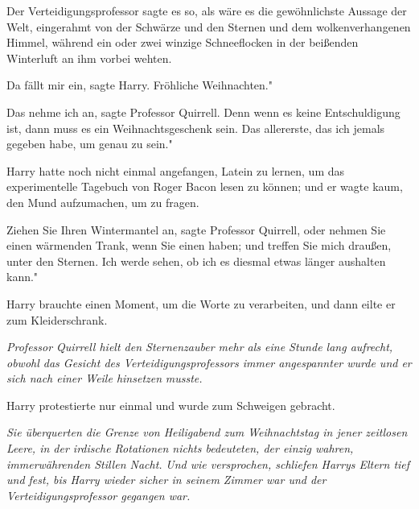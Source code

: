 Der Verteidigungsprofessor sagte es so, als wäre es die gewöhnlichste Aussage
der Welt, eingerahmt von der Schwärze und den Sternen und dem wolkenverhangenen
Himmel, während ein oder zwei winzige Schneeflocken in der beißenden Winterluft
an ihm vorbei wehten.

\glqq{}Da fällt mir ein\grqq{}, sagte Harry. \glqq{}Fröhliche Weihnachten."

\glqq{}Das nehme ich an\grqq{}, sagte Professor Quirrell. \glqq{}Denn wenn es
keine Entschuldigung ist, dann muss es ein Weihnachtsgeschenk sein. Das
allererste, das ich jemals gegeben habe, um genau zu sein."

Harry hatte noch nicht einmal angefangen, Latein zu lernen, um das
experimentelle Tagebuch von Roger Bacon lesen zu können; und er wagte kaum, den
Mund aufzumachen, um zu fragen.

\glqq{}Ziehen Sie Ihren Wintermantel an\grqq{}, sagte Professor Quirrell, \glqq
oder nehmen Sie einen wärmenden Trank, wenn Sie einen haben; und treffen Sie
mich draußen, unter den Sternen. Ich werde sehen, ob ich es diesmal etwas länger
aushalten kann."

Harry brauchte einen Moment, um die Worte zu verarbeiten, und dann eilte er zum
Kleiderschrank.

\emph{Professor Quirrell hielt den Sternenzauber mehr als eine Stunde lang
aufrecht, obwohl das Gesicht des Verteidigungsprofessors immer angespannter
wurde und er sich nach einer Weile hinsetzen} \emph{musste.}

Harry protestierte nur einmal und wurde zum Schweigen gebracht.

\emph{Sie überquerten die Grenze von Heiligabend zum Weihnachtstag in jener
zeitlosen Leere, in der irdische Rotationen nichts bedeuteten, der einzig
wahren, immerwährenden Stillen Nacht.}\emph{ Und wie versprochen, schliefen
Harrys Eltern tief und fest, bis Harry wieder sicher in seinem Zimmer war und
der Verteidigungsprofessor gegangen war.}

